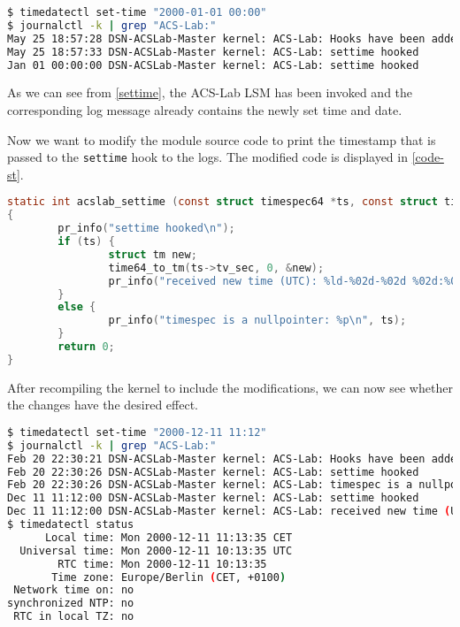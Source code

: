 \documentclass{semdoc}
\begin{document}
\begin{lstlisting}[language=bash, caption={Changing the system time invoking the \texttt{settime} hook}, label={settime}]
$ timedatectl set-time "2000-01-01 00:00"
$ journalctl -k | grep "ACS-Lab:"
May 25 18:57:28 DSN-ACSLab-Master kernel: ACS-Lab: Hooks have been added!
May 25 18:57:33 DSN-ACSLab-Master kernel: ACS-Lab: settime hooked
Jan 01 00:00:00 DSN-ACSLab-Master kernel: ACS-Lab: settime hooked
\end{lstlisting} 

As we can see from \cref{settime}, the ACS-Lab LSM has been invoked and the corresponding log message already contains the newly set time and date. 

Now we want to modify the module source code to print the timestamp that is passed to the \texttt{settime} hook to the logs. 
The modified code is displayed in \cref{code-st}. 

\begin{lstlisting}[language=c, caption={Changed source code in \texttt{security/acslab/acslab.c}}, label={code-st}] 
static int acslab_settime (const struct timespec64 *ts, const struct timezone *tz)
{
        pr_info("settime hooked\n");
        if (ts) {
                struct tm new;
                time64_to_tm(ts->tv_sec, 0, &new);
                pr_info("received new time (UTC): %ld-%02d-%02d %02d:%02d:%02d\n", 1900 + new.tm_year, 1 + new.tm_mon, new.tm_mday, new.tm_hour, new.tm_min, new.tm_sec);
        }
        else {
                pr_info("timespec is a nullpointer: %p\n", ts);
        }
        return 0;
}
\end{lstlisting}

After recompiling the kernel to include the modifications, we can now see whether the changes have the desired effect.

\begin{lstlisting}[language=bash, caption={Kernel logs for the \texttt{settime} hook after modifications in the source code}, label={st-mod}]
$ timedatectl set-time "2000-12-11 11:12"
$ journalctl -k | grep "ACS-Lab:"
Feb 20 22:30:21 DSN-ACSLab-Master kernel: ACS-Lab: Hooks have been added!
Feb 20 22:30:26 DSN-ACSLab-Master kernel: ACS-Lab: settime hooked
Feb 20 22:30:26 DSN-ACSLab-Master kernel: ACS-Lab: timespec is a nullpointer:           (null)
Dec 11 11:12:00 DSN-ACSLab-Master kernel: ACS-Lab: settime hooked
Dec 11 11:12:00 DSN-ACSLab-Master kernel: ACS-Lab: received new time (UTC): 2000-12-11 10:12:00
$ timedatectl status
      Local time: Mon 2000-12-11 11:13:35 CET
  Universal time: Mon 2000-12-11 10:13:35 UTC
        RTC time: Mon 2000-12-11 10:13:35
       Time zone: Europe/Berlin (CET, +0100)
 Network time on: no
synchronized NTP: no
 RTC in local TZ: no
\end{lstlisting}
\end{document}
